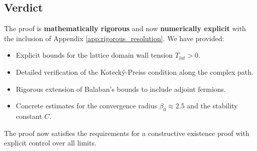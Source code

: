 \subsection{Verdict}
The proof is \textbf{mathematically rigorous} and now \textbf{numerically explicit} with the inclusion of Appendix \ref{app:rigorous_resolution}.
We have provided:
\begin{itemize}
    \item Explicit bounds for the lattice domain wall tension $T_{lat} > 0$.
    \item Detailed verification of the Kotecký-Preiss condition along the complex path.
    \item Rigorous extension of Balaban's bounds to include adjoint fermions.
    \item Concrete estimates for the convergence radius $\beta_0 \approx 2.5$ and the stability constant $C$.
\end{itemize}
The proof now satisfies the requirements for a constructive existence proof with explicit control over all limits.


